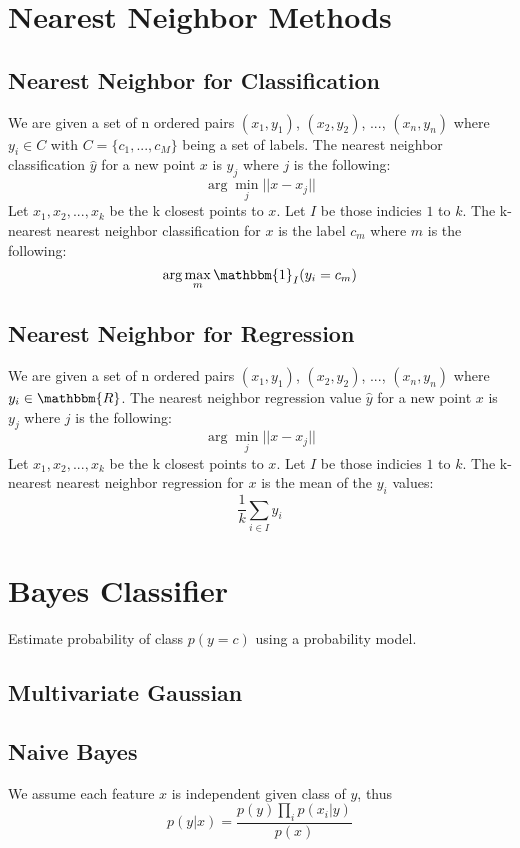\documentclass[twoside,11pt]{article}
\theoremstyle{definition}
\begin{document}
\section{Nearest Neighbor Methods}

\subsection{Nearest Neighbor for Classification}

We are given a set of n ordered pairs $(x_1,y_1)$, $(x_2,y_2)$, ..., $(x_n,y_n)$ where $y_i \in C$ with $C=\{ c_1, ..., c_M \}$ being a set of labels. The nearest neighbor classification $\hat{y}$ for a new point $x$ is $y_j$ where $j$ is the following:
\[
\arg \min_j||x-x_j||
\]
Let $x_1,x_2,...,x_k$ be the k closest points to $x$. Let $I$ be those indicies $1$ to $k$. The k-nearest nearest neighbor classification for $x$ is the label $c_m$ where $m$ is the following:
\[
\arg \max_m \mathbbm{1}_{I}{(y_i=c_m)}
\]

\subsection{Nearest Neighbor for Regression}

We are given a set of n ordered pairs $(x_1,y_1)$, $(x_2,y_2)$, ..., $(x_n,y_n)$ where $y_i \in \mathbbm{R}$. The nearest neighbor regression value $\hat{y}$ for a new point $x$ is $y_j$ where $j$ is the following:
\[
\arg \min_j||x-x_j||
\]
Let $x_1,x_2,...,x_k$ be the k closest points to $x$. Let $I$ be those indicies $1$ to $k$. The k-nearest nearest neighbor regression for $x$ is the mean of the $y_i$ values:
\[
\frac{1}{k} \sum_{i \in I} y_i
\]

\section{Bayes Classifier}

Estimate probability of class $p(y=c)$ using a probability model. 

\subsection{Multivariate Gaussian}

\subsection{Naive Bayes}

We assume each feature $x$ is independent given class of $y$, thus 
\[
p(y|x) = \frac{p(y)\prod_i p(x_i|y)}{p(x)}
\]
\end{document}
